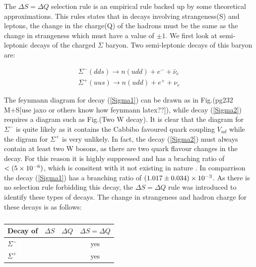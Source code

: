 The $\Delta S = \Delta Q$ selection rule is an empirical rule backed up by some theoretical approximations. This rules states that in decays involving strangeness(S) and leptons, the change in the charge(Q) of the hadrons must be the same as the change in strangeness which must have a value of $\pm 1$. We first look at semi-leptonic decays of the charged $\Sigma$ baryon. Two semi-leptonic decays of this baryon are:

\begin{align}
\label{Sigma1}
\Sigma^{-} (dds) \rightarrow n(udd) + e^{-} + \bar{\nu}_{e} \\
\label{Sigma2}
\Sigma^{+} (uus) \rightarrow n(udd) + e^{+} + \nu_{e}
\end{align}  

\noindent The feynmann diagram for decay (\ref{Sigma1}) can be drawn as in Fig.(pg232 M+S[use jaxo or others know how feynmann latex??]), while decay (\ref{Sigma2}) requires a diagram such as Fig.(Two W decay). It is clear that the diagram for $\Sigma^{-}$ is quite likely as it contains the Cabbibo favoured quark coupling $V_{ud}$ while the digram for $\Sigma^{+}$ is very unlikely. In fact, the decay (\ref{Sigma2}) must always contain at least two W bosons, as there are two quark flavour changes in the decay. For this reason it is highly suppressed and has a braching ratio of $< (5\times 10^{-6})$, which is consitent with it not existing in nature \cite{PDGKaons}. In comparrison the decay (\ref{Sigma1}) has a branching ratio of $(1.017 \pm 0.034) \times 10^{-3}$. As there is no selection rule forbidding this decay, the $\Delta S = \Delta Q$ rule was introduced to identify these types of decays. The change in strangeness and hadron charge for these decays is as follows:

\begin{table}[h!]
\caption{\textit{}}
\centering
\setlength{\tabcolsep}{10pt}
\begin{tabular}{l| ccc}
\hline
Decay of   & $\Delta S$ & $\Delta Q$ & $\Delta S = \Delta Q$ \\ 
\hline \hline
$\Sigma^{-}$ &            &            & yes                   \\
$\Sigma^{+}$ &            &            & yes                   \\
\hline
\end{tabular} 
\label{PhysProp}
\end{table}

